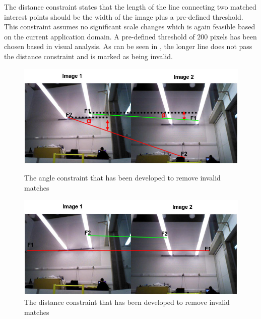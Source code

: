 The distance constraint states that the length of the line connecting two matched interest points should be the width of the image plus a pre-defined threshold. This constraint assumes no significant scale changes which is again feasible based on the current application domain. A pre-defined threshold of $200$ pixels has been chosen based in visual analysis. As can be seen in , the longer line does not pass the distance constraint and is marked as being invalid.\\

\begin{figure}[ht!]
\begin{minipage}[b]{0.5\linewidth}
  \centering
    \includegraphics[width=1.0\textwidth]{../Drawings/constraints/angleConstraintMerged.jpg}
    \caption{The angle constraint that has been developed to remove invalid matches} 
    \label{fig:angleConstraint}
\end{minipage}
\begin{minipage}[b]{0.5\linewidth}
  \centering
    \includegraphics[width=1.0\textwidth]{../Drawings/constraints/distanceConstraint.jpg}
    \caption{The distance constraint that has been developed to remove invalid matches} 
    \label{fig:distanceConstraint}
\end{minipage}
\end{figure}


